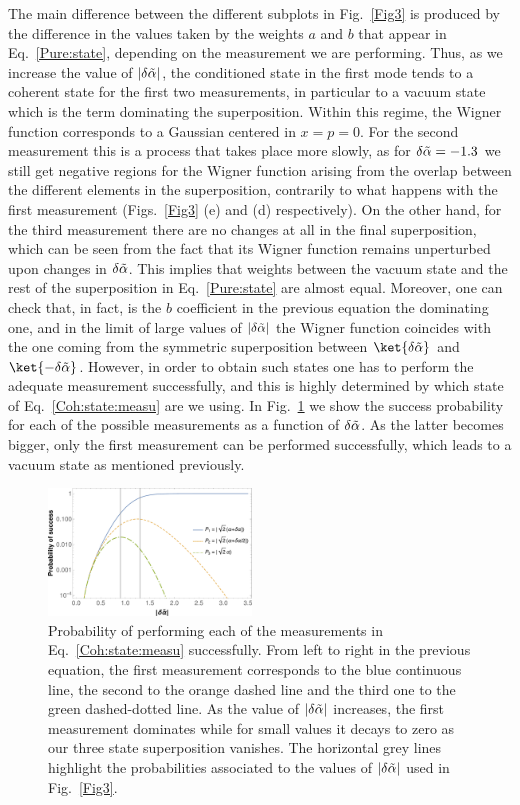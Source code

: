 The main difference between the different subplots in Fig.~\ref{Fig3} is produced by the difference in the values taken by the weights $a$ and $b$ that appear in Eq.~\eqref{Pure:state}, depending on the measurement we are performing. Thus, as we increase the value of $|\delta \Tilde{\alpha}|$, the conditioned state in the first mode tends to a coherent state for the first two measurements, in particular to a vacuum state which is the term dominating the superposition. Within this regime, the Wigner function corresponds to a Gaussian centered in $x=p=0$. For the second measurement this is a process that takes place more slowly, as for $\delta \Tilde{\alpha} = -1.3$ we still get negative regions for the Wigner function arising from the overlap between the different elements in the superposition, contrarily to what happens with the first measurement (Figs.~\ref{Fig3} (e) and (d) respectively). On the other hand, for the third measurement there are no changes at all in the final superposition, which can be seen from the fact that its Wigner function remains unperturbed upon changes in $\delta \Tilde{\alpha}$. This implies that weights between the vacuum state and the rest of the superposition in Eq.~\eqref{Pure:state} are almost equal. Moreover, one can check that, in fact, is the $b$ coefficient in the previous equation the dominating one, and in the limit of large values of $|\delta \Tilde{\alpha}|$ the Wigner function coincides with the one coming from the symmetric superposition between $\ket{\delta \Tilde{\alpha}}$ and $\ket{-\delta\Tilde{\alpha}}$. However, in order to obtain such states one has to perform the adequate measurement successfully, and this is highly determined by which state of Eq.~\eqref{Coh:state:measu} are we using. In Fig.~\ref{Fig4} we show the success probability for each of the possible measurements as a function of $\delta \Tilde{\alpha}$. As the latter becomes bigger, only the first measurement can be performed successfully, which leads to a vacuum state as mentioned previously.
\begin{figure}
    \centering
    \includegraphics[width = 0.48\textwidth]{Fig4.pdf}
    \caption{Probability of performing each of the measurements in Eq.~\eqref{Coh:state:measu} successfully. From left to right in the previous equation, the first measurement corresponds to the blue continuous line, the second to the orange dashed line and the third one to the green dashed-dotted line. As the value of $|\delta \Tilde{\alpha}|$ increases, the first measurement dominates while for small values it decays to zero as our three state superposition vanishes. The horizontal grey lines highlight the probabilities associated to the values of $|\delta\Tilde{\alpha}|$ used in Fig.~\ref{Fig3}.}
    \label{Fig4}
\end{figure}

